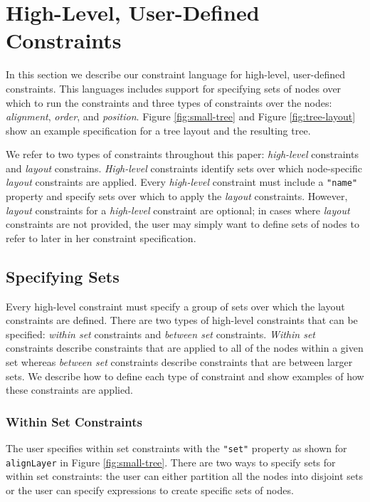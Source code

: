 \section{High-Level, User-Defined Constraints}
\treeLayout
In this section we describe our constraint language for high-level, user-defined constraints. This languages includes support for specifying sets of nodes over which to run the constraints and three types of constraints over the nodes: \emph{alignment}, \emph{order}, and \emph{position}. Figure \ref{fig:small-tree} and Figure \ref{fig:tree-layout} show an example specification for a tree layout and the resulting tree. 

We refer to two types of constraints throughout this paper: \emph{high-level} constraints and \emph{layout} constrains. \emph{High-level} constraints identify sets over which node-specific \emph{layout} constraints are applied. Every \emph{high-level} constraint must include a \texttt{"name"} property and specify sets over which to apply the \emph{layout} constraints. However, \emph{layout} constraints for a \emph{high-level} constraint are optional; in cases where \emph{layout} constraints are not provided, the user may simply want to define sets of nodes to refer to later in her constraint specification.

\subsection{Specifying Sets}
\label{sec:sets}
Every high-level constraint must specify a group of sets over which the layout constraints are defined. There are two types of high-level constraints that can be specified: \emph{within set} constraints and \emph{between set} constraints. \emph{Within set} constraints describe constraints that are applied to all of the nodes within a given set whereas \emph{between set} constraints describe constraints that are between larger sets. We describe how to define each type of constraint and show examples of how these constraints are applied.

\subsubsection{Within Set Constraints}
The user specifies within set constraints with the \texttt{"set"} property as shown for \texttt{alignLayer} in Figure \ref{fig:small-tree}. There are two ways to specify sets for within set constraints: the user can either partition all the nodes into disjoint sets or the user can specify expressions to create specific sets of nodes.


